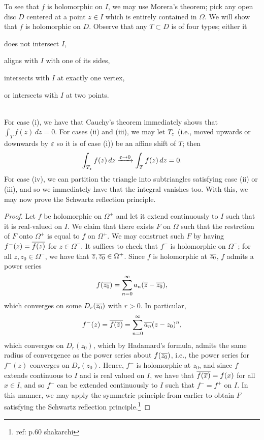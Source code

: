 \noindent To see that $f$ is holomorphic on $I$, we may use Morera's theorem; pick any open disc $D$ centered at a point $z \in I$ which is entirely contained in $\Omega$. We will show that $f$ is holomorphic on $D$. Observe that any $T \subset D$ is of four types; either it \begin{parlist} \item does not intersect $I$, \item aligns with $I$ with one of its sides, \item intersects with $I$ at exactly one vertex, \item or intersects with $I$ at two points. \end{parlist} \\[8pt]
For case (i), we have that Cauchy's theorem immediately shows that $\int_T f(z) \, dz = 0$. For cases (ii) and (iii), we may let $T_\varepsilon$ (i.e., moved upwards or downwards by $\varepsilon$ so it is of case (i)) be an affine shift of $T$; then
\[ \int_{T_\varepsilon} f(z) \, dz \xrightarrow{\varepsilon \to 0} \int_T f(z) \, dz = 0. \]
For case (iv), we can partition the triangle into subtriangles satisfying case (ii) or (iii), and so we immediately have that the integral vanishes too.
\newpage
\noindent With this, we may now prove the Schwartz reflection principle.
\begin{proof}
    Let $f$ be holomorphic on $\Omega^+$ and let it extend continuously to $I$ such that it is real-valued on $I$. We claim that there exists $F$ on $\Omega$ such that the restrction of $F$ onto $\Omega^+$ is equal to $f$ on $\Omega^+$. We may construct such $F$ by having $f^-(z) = \overline{f(z)}$ for $z \in \Omega^-$. It suffices to check that $f^-$ is holomorphic on $\Omega^-$; for all $z, z_0 \in \Omega^-$, we have that $\overline z, \overline{z_0} \in \Omega^+$. Since $f$ is holomorphic at $\overline{z_0}$, $f$ admits a power series
    \[ f(\overline{z_0}) = \sum_{n=0}^\infty a_n(\overline z - \overline{z_0}), \]
    which converges on some $D_r(\overline{z_0})$ with $r > 0$. In particular,
    \[ f^-(z) = \overline{f(\overline z)} = \sum_{n=0}^\infty \overline{a_n} (z-z_0)^n, \]
    which converges on $D_r(z_0)$, which by Hadamard's formula, admits the same radius of convergence as the power series about $f(\overline{z_0})$, i.e., the power series for $f^-(z)$ converges on $D_r(z_0)$. Hence, $f^-$ is holomorphic at $z_0$, and since $f$ extends continuous to $I$ and is real valued on $I$, we have that $\overline{f(\overline x)} = f(x)$ for all $x \in I$, and so $f^-$ can be extended continuously to $I$ such that $f^- = f^+$ on $I$. In this manner, we may apply the symmetric principle from earlier to obtain $F$ satisfying the Schwartz reflection principle.\footnote{ref: p.60 shakarchi}
\end{proof}

